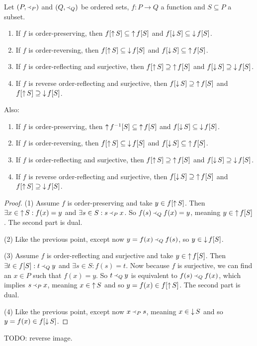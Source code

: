 \begin{lemma} \label{imageUpDownsets}
Let $(P, \Yleft_P)$ and $(Q, \Yleft_Q)$ be ordered sets, $f: P\to Q$ a function and $S\subseteq P$ a subset.
\begin{enumerate}
\item If $f$ is order-preserving, then $f[\mathop{\uparrow} S] \subseteq \mathop{\uparrow} f[S]$ and $f[\mathop{\downarrow} S] \subseteq \mathop{\downarrow} f[S]$.
\item If $f$ is order-reversing, then $f[\mathop{\uparrow} S] \subseteq \mathop{\downarrow} f[S]$ and $f[\mathop{\downarrow} S] \subseteq \mathop{\uparrow} f[S]$.
\item If $f$ is order-reflecting and surjective, then $f[\mathop{\uparrow} S] \supseteq \mathop{\uparrow} f[S]$ and $f[\mathop{\downarrow} S] \supseteq \mathop{\downarrow} f[S]$.
\item If $f$ is reverse order-reflecting and surjective, then $f[\mathop{\downarrow} S] \supseteq \mathop{\uparrow} f[S]$ and $f[\mathop{\uparrow} S] \supseteq \mathop{\downarrow} f[S]$.
\end{enumerate}
Also:
\begin{enumerate}
\item If $f$ is order-preserving, then $\mathop{\uparrow} f^{-1}[S] \subseteq \mathop{\uparrow} f[S]$ and $f[\mathop{\downarrow} S] \subseteq \mathop{\downarrow} f[S]$.
\item If $f$ is order-reversing, then $f[\mathop{\uparrow} S] \subseteq \mathop{\downarrow} f[S]$ and $f[\mathop{\downarrow} S] \subseteq \mathop{\uparrow} f[S]$.
\item If $f$ is order-reflecting and surjective, then $f[\mathop{\uparrow} S] \supseteq \mathop{\uparrow} f[S]$ and $f[\mathop{\downarrow} S] \supseteq \mathop{\downarrow} f[S]$.
\item If $f$ is reverse order-reflecting and surjective, then $f[\mathop{\downarrow} S] \supseteq \mathop{\uparrow} f[S]$ and $f[\mathop{\uparrow} S] \supseteq \mathop{\downarrow} f[S]$.
\end{enumerate}
\end{lemma}
\begin{proof}
(1) Assume $f$ is order-preserving and take $y\in f[\mathop{\uparrow} S]$. Then $\exists x\in \mathop{\uparrow} S: f(x) = y$ and $\exists s\in S: s\Yleft_P x$. So $f(s) \Yleft_Q f(x) = y$, meaning $y\in \mathop{\uparrow} f[S]$. The second part is dual.

(2) Like the previous point, except now $y = f(x) \Yleft_Q f(s)$, so $y \in \mathop{\downarrow} f[S]$.

(3) Assume $f$ is order-reflecting and surjective and take $y\in \mathop{\uparrow} f[S]$. Then $\exists t\in f[S]: t \Yleft_Q y$ and $\exists s\in S: f(s) = t$. Now because $f$ is surjective, we can find an $x\in P$ such that $f(x) = y$. So $t \Yleft_Q y$ is equivalent to $f(s) \Yleft_Q f(x)$, which implies $s \Yleft_P x$, meaning $x\in \mathop{\uparrow} S$ and so $y = f(x) \in f[\mathop{\uparrow} S]$. The second part is dual.

(4) Like the previous point, except now $x\Yleft_P s$, meaning $x\in \mathop{\downarrow} S$ and so $y = f(x) \in f[\mathop{\downarrow} S]$.
\end{proof}
TODO: reverse image.

